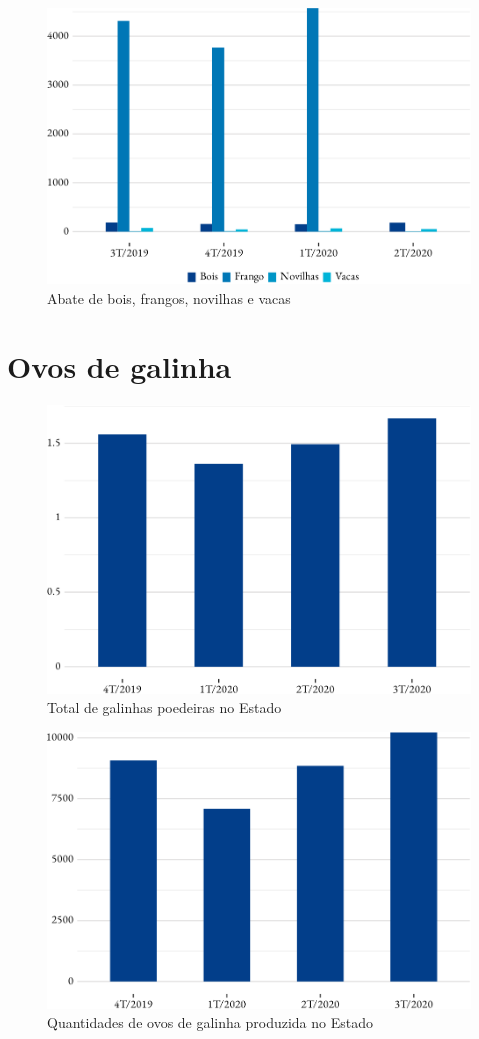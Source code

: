 \begin{figure}[h]
	\caption{Abate de bois, frangos, novilhas e vacas}
	\includegraphics{fig/abates-1.pdf}
\end{figure}
	

\section{Ovos de galinha}

\begin{figure}[h]
	\caption{Total de galinhas poedeiras no Estado}
	\includegraphics{fig/galinha_poedeiras-1.pdf}
\end{figure}

\begin{figure}[h]
	\caption{Quantidades de ovos de galinha produzida no Estado}
	\includegraphics{fig/ovos_galinha-1.pdf}
\end{figure}

